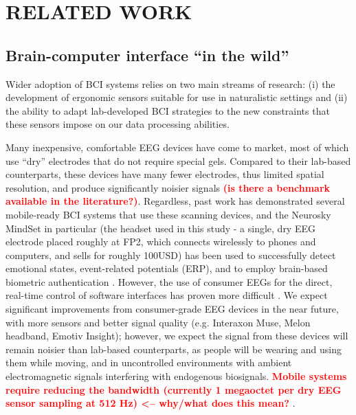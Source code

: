 \section{\uppercase{Related Work}}
\subsection{Brain-computer interface ``in the wild''}

\noindent Wider adoption of BCI systems relies on two main streams of research: (i) the development of ergonomic sensors suitable for use in naturalistic settings and (ii) the ability to adapt lab-developed BCI strategies to the new constraints that these sensors impose on our data processing abilities. 

Many inexpensive, comfortable EEG devices have come to market, most of which use ``dry'' electrodes that do not require special gels. Compared to their lab-based counterparts, these devices have many fewer electrodes, thus limited spatial resolution, and produce significantly noisier signals \textcolor{red}{\bf (is there a benchmark available in the literature?)}. Regardless, past work has demonstrated several mobile-ready BCI systems that use these scanning devices, and the Neurosky MindSet in particular (the headset used in this study - a single, dry EEG electrode placed roughly at FP2, which connects wirelessly to phones and computers, and sells for roughly 100USD) has been used to successfully detect emotional states, event-related potentials (ERP), and to employ brain-based biometric authentication \cite{crowley_evaluating_2010,grierson_better_2011,adams_i_2013}.  However, the use of consumer EEGs for the direct, real-time control of software interfaces has proven more difficult \cite{carrino_self-paced_2012,larsen_classification_2011}. We expect significant improvements from consumer-grade EEG devices in the near future, with more sensors and better signal quality (e.g. Interaxon Muse, Melon headband, Emotiv Insight); however, we expect the signal from these devices will remain noisier than lab-based counterparts, as people will be wearing and using them while moving, and in uncontrolled environments with ambient electromagnetic signals interfering with endogenous biosignals. \textcolor{red}{\bf Mobile systems require reducing the bandwidth (currently 1 megaoctet per dry EEG sensor sampling at 512 Hz) <-- why/what does this mean? }.

